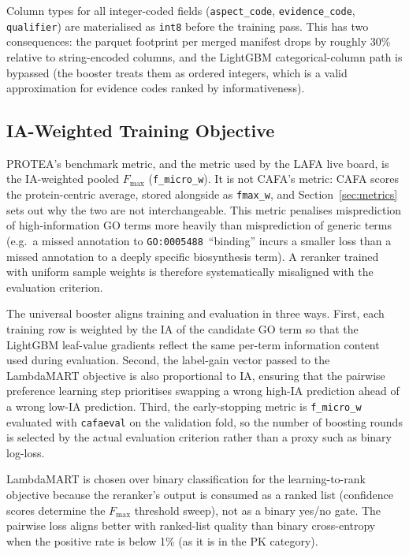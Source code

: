 Column types for all integer-coded fields (\texttt{aspect\_code},
\texttt{evidence\_code}, \texttt{qualifier}) are materialised as
\texttt{int8} before the training pass. This has two consequences: the parquet
footprint per merged manifest drops by roughly 30\% relative to
string-encoded columns, and the LightGBM categorical-column path is bypassed
(the booster treats them as ordered integers, which is a valid approximation
for evidence codes ranked by informativeness).

\subsection{IA-Weighted Training Objective}
\label{subsec:universal-ia-weighting}

PROTEA's benchmark metric, and the metric used by the LAFA live board, is the
IA-weighted pooled $F_{\max}$ (\texttt{f\_micro\_w}). It is not CAFA's metric:
CAFA scores the protein-centric average, stored alongside as \texttt{fmax\_w},
and Section~\ref{sec:metrics} sets out why the two are not interchangeable. This metric
penalises misprediction of high-information GO terms more heavily than
misprediction of generic terms (e.g.\ a missed annotation to
\texttt{GO:0005488}~``binding'' incurs a smaller loss than a missed annotation
to a deeply specific biosynthesis term). A reranker trained with uniform
sample weights is therefore systematically misaligned with the evaluation
criterion.

The universal booster aligns training and evaluation in three ways. First,
each training row is weighted by the IA of the candidate GO term so that the
LightGBM leaf-value gradients reflect the same per-term information content
used during evaluation. Second, the label-gain vector passed to the LambdaMART
objective is also proportional to IA, ensuring that the pairwise preference
learning step prioritises swapping a wrong high-IA prediction ahead of a wrong
low-IA prediction. Third, the early-stopping metric is \texttt{f\_micro\_w}
evaluated with \texttt{cafaeval} on the validation fold, so the number of
boosting rounds is selected by the actual evaluation criterion rather than a
proxy such as binary log-loss.

LambdaMART is chosen over binary classification for the learning-to-rank
objective because the reranker's output is consumed as a ranked list
(confidence scores determine the $F_{\max}$ threshold sweep), not as a binary
yes/no gate. The pairwise loss aligns better with ranked-list quality than
binary cross-entropy when the positive rate is below 1\% (as it is in the PK
category).


